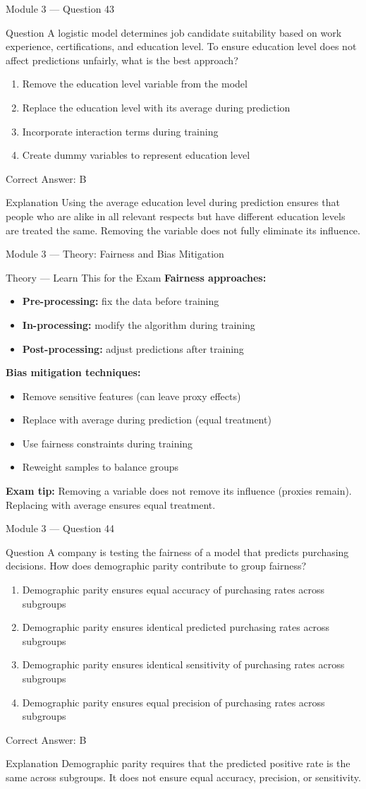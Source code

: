 \documentclass[aspectratio=169,10pt]{beamer}
\newcommand{\question}[1]{%
	\begin{block}{Question}
		#1
	\end{block}
}
\newcommand{\options}[4]{%
	\begin{enumerate}[label=\Alph*.,leftmargin=*]
		\item #1
		\item #2
		\item #3
		\item #4
	\end{enumerate}
}
\newcommand{\answerbox}[1]{%
	\begin{exampleblock}{Correct Answer: #1}
	\end{exampleblock}
}
\newcommand{\explain}[1]{%
	\begin{block}{Explanation}
		\small #1
	\end{block}
}
\newcommand{\theory}[1]{%
	\begin{block}{Theory --- Learn This for the Exam}
		\small #1
	\end{block}
}
\begin{document}
	\begin{frame}{Module 3 --- Question 43}
		\question{A logistic model determines job candidate suitability based on work experience, certifications, and education level. To ensure education level does not affect predictions unfairly, what is the best approach?}
		\options{Remove the education level variable from the model}{Replace the education level with its average during prediction}{Incorporate interaction terms during training}{Create dummy variables to represent education level}
		\answerbox{B}
		\explain{Using the average education level during prediction ensures that people who are alike in all relevant respects but have different education levels are treated the same. Removing the variable does not fully eliminate its influence.}
	\end{frame}
	
	\begin{frame}{Module 3 --- Theory: Fairness and Bias Mitigation}
		\theory{
			\textbf{Fairness approaches:}
			\begin{itemize}
				\item \textbf{Pre-processing:} fix the data before training
				\item \textbf{In-processing:} modify the algorithm during training
				\item \textbf{Post-processing:} adjust predictions after training
			\end{itemize}
			\textbf{Bias mitigation techniques:}
			\begin{itemize}
				\item Remove sensitive features (can leave proxy effects)
				\item Replace with average during prediction (equal treatment)
				\item Use fairness constraints during training
				\item Reweight samples to balance groups
			\end{itemize}
			\textbf{Exam tip:} Removing a variable does not remove its influence (proxies remain). Replacing with average ensures equal treatment.
		}
	\end{frame}
	
	\begin{frame}{Module 3 --- Question 44}
		\question{A company is testing the fairness of a model that predicts purchasing decisions. How does demographic parity contribute to group fairness?}
		\options{Demographic parity ensures equal accuracy of purchasing rates across subgroups}{Demographic parity ensures identical predicted purchasing rates across subgroups}{Demographic parity ensures identical sensitivity of purchasing rates across subgroups}{Demographic parity ensures equal precision of purchasing rates across subgroups}
		\answerbox{B}
		\explain{Demographic parity requires that the predicted positive rate is the same across subgroups. It does not ensure equal accuracy, precision, or sensitivity.}
	\end{frame}
	
\end{document}
